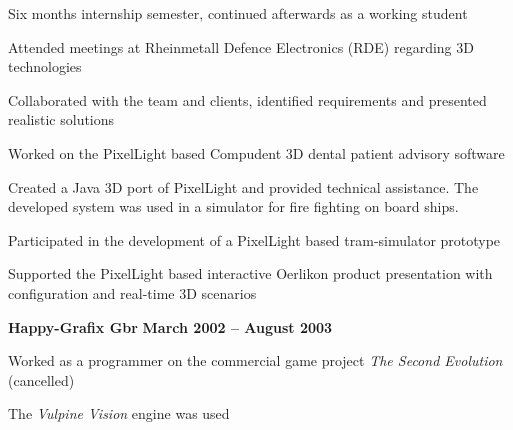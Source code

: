 \documentclass[margin,line]{Ofenberg_Resume}
\begin{document}
\begin{resume}
\begin{list2}
		\item Six months internship semester, continued afterwards as a working student
		\item Attended meetings at Rheinmetall Defence Electronics (RDE) regarding 3D technologies
		\item Collaborated with the team and clients, identified requirements and presented realistic solutions
		\item Worked on the PixelLight based Compudent 3D dental patient advisory software
		\item Created a Java 3D port of PixelLight and provided technical assistance. The developed system was used in a simulator for fire fighting on board ships.
		\item Participated in the development of a PixelLight based tram-simulator prototype
		\item Supported the PixelLight based interactive Oerlikon product presentation with configuration and real-time 3D scenarios
	\end{list2}\vspace{-1.5mm}
	\textbf{Happy-Grafix Gbr} \hfill \textbf{March 2002 -- August 2003}\vspace{-3mm}\\\vspace{-1mm}%
	\begin{list2}
		\item Worked as a programmer on the commercial game project \emph{The Second Evolution} (cancelled)
		\item The \emph{Vulpine Vision} engine was used
	\end{list2}\vspace{-1.5mm}



\end{resume}
\end{document}
